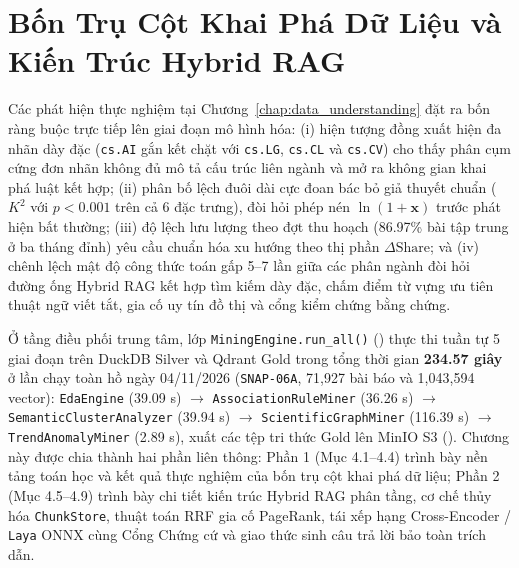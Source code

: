 
\chapter{Bốn Trụ Cột Khai Phá Dữ Liệu và Kiến Trúc Hybrid RAG}
\label{chap:modeling}

Các phát hiện thực nghiệm tại Chương~\ref{chap:data_understanding} đặt ra bốn ràng buộc trực tiếp lên giai đoạn mô hình hóa: (i) hiện tượng đồng xuất hiện đa nhãn dày đặc (\texttt{cs.AI} gắn kết chặt với \texttt{cs.LG}, \texttt{cs.CL} và \texttt{cs.CV}) cho thấy phân cụm cứng đơn nhãn không đủ mô tả cấu trúc liên ngành và mở ra không gian khai phá luật kết hợp; (ii) phân bố lệch đuôi dài cực đoan bác bỏ giả thuyết chuẩn ($K^2$ với $p < 0.001$ trên cả 6 đặc trưng), đòi hỏi phép nén $\ln(1 + \mathbf{x})$ trước phát hiện bất thường; (iii) độ lệch lưu lượng theo đợt thu hoạch (86.97\% bài tập trung ở ba tháng đỉnh) yêu cầu chuẩn hóa xu hướng theo thị phần $\Delta\text{Share}$; và (iv) chênh lệch mật độ công thức toán gấp 5--7 lần giữa các phân ngành đòi hỏi đường ống Hybrid RAG kết hợp tìm kiếm dày đặc, chấm điểm từ vựng ưu tiên thuật ngữ viết tắt, gia cố uy tín đồ thị và cổng kiểm chứng bằng chứng.

Ở tầng điều phối trung tâm, lớp \texttt{MiningEngine.run\_all()} () thực thi tuần tự 5 giai đoạn trên DuckDB Silver và Qdrant Gold trong tổng thời gian \textbf{234.57 giây} ở lần chạy toàn hồ ngày 04/11/2026 (\texttt{SNAP-06A}, 71,927 bài báo và 1,043,594 vector): \texttt{EdaEngine} (39.09 s) $\rightarrow$ \texttt{AssociationRuleMiner} (36.26 s) $\rightarrow$ \texttt{SemanticClusterAnalyzer} (39.94 s) $\rightarrow$ \texttt{ScientificGraphMiner} (116.39 s) $\rightarrow$ \texttt{TrendAnomalyMiner} (2.89 s), xuất các tệp tri thức Gold lên MinIO S3 (). Chương này được chia thành hai phần liên thông: Phần 1 (Mục 4.1--4.4) trình bày nền tảng toán học và kết quả thực nghiệm của bốn trụ cột khai phá dữ liệu; Phần 2 (Mục 4.5--4.9) trình bày chi tiết kiến trúc Hybrid RAG phân tầng, cơ chế thủy hóa \texttt{ChunkStore}, thuật toán RRF gia cố PageRank, tái xếp hạng Cross-Encoder / \texttt{Laya} ONNX cùng Cổng Chứng cứ và giao thức sinh câu trả lời bảo toàn trích dẫn.




